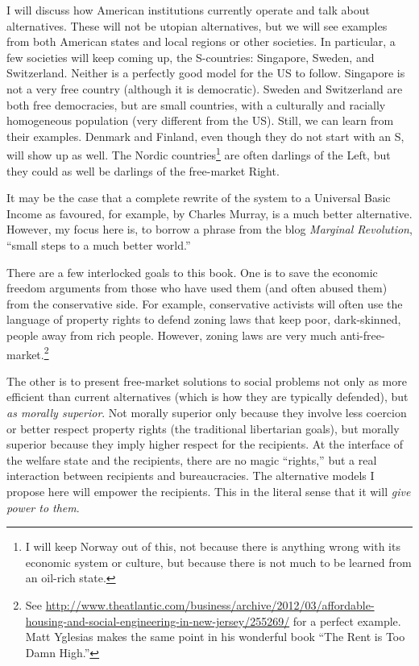 I will discuss how American institutions currently operate and talk about
alternatives. These will not be utopian alternatives, but we will see examples
from both American states and local regions or other societies. In particular,
a few societies will keep coming up, the S-countries: Singapore, Sweden, and
Switzerland. Neither is a perfectly good model for the US to follow. Singapore
is not a very free country (although it is democratic). Sweden and Switzerland
are both free democracies, but are small countries, with a culturally and
racially homogeneous population (very different from the US). Still, we can
learn from their examples. Denmark and Finland, even though they do not start
with an S, will show up as well. The Nordic countries\footnote{I will keep
Norway out of this, not because there is anything wrong with its economic
system or culture, but because there is not much to be learned from an oil-rich
state.} are often darlings of the Left, but they could as well be darlings of
the free-market Right.

It may be the case that a complete rewrite of the system to a Universal Basic
Income as favoured, for example, by Charles Murray, is a much better
alternative. However, my focus here is, to borrow a phrase from the blog
\emph{Marginal Revolution}, ``small steps to a much better world.''

\bigskip
\bigskip

There are a few interlocked goals to this book. One is to save the economic
freedom arguments from those who have used them (and often abused them) from
the conservative side. For example, conservative activists will often use the
language of property rights to defend zoning laws that keep poor, dark-skinned,
people away from rich people. However, zoning laws are very much
anti-free-market.\footnote{See
\url{http://www.theatlantic.com/business/archive/2012/03/affordable-housing-and-social-engineering-in-new-jersey/255269/}
for a perfect example. Matt Yglesias makes the same point in his wonderful book
``The Rent is Too Damn High.''} %

The other is to present free-market solutions to social problems not only as
more efficient than current alternatives (which is how they are typically
defended), but \emph{as morally superior}. Not morally superior only because
they involve less coercion or better respect property rights (the
traditional libertarian goals), but morally superior because they imply higher
respect for the recipients. At the interface of the welfare state and the
recipients, there are no magic ``rights,'' but a real interaction between
recipients and bureaucracies. The alternative models I propose here will empower
the recipients. This in the literal sense that it will \emph{give power to them}.

